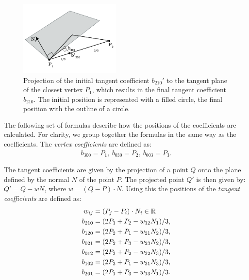 	\begin{figure}
		\centering
		\includegraphics[width=0.45\textwidth]{./content/img/method/geometry_computation.png}
		\caption{Projection of the initial tangent coefficient $b_{210}'$ to the tangent plane of the closest vertex $P_1$, which results in the final tangent coefficient $b_{210}$. The initial position is represented with a filled circle, the final position with the outline of a circle.}
		\label{fig:method:geometry_tangent_projection.png}
	\end{figure}

	The following set of formulas describe how the positions of the coefficients are calculated. For clarity, we group together the formulas in the same way as the coefficients. The \textit{vertex coefficients} are defined as:
	\begin{align}\label{eq:method:vertex_coefficients}
		b_{300} = P_1,\ b_{030} = P_2,\ b_{003} = P_3.
	\end{align}

	The tangent coefficients are given by the projection of a point $Q$ onto the plane defined by the normal $N$ of the point $P$. The projected point $Q'$ is then given by: $Q' = Q - wN$, where $w = (Q - P) \cdot N$. Using this the positions of the \textit{tangent coefficients} are defined as:
	\begin{align}\label{eq:method:tangent_coefficients}
		w_{ij} = {}& (P_j - P_i) \cdot N_i \in \mathbb{R} \nonumber\\
		b_{210} = {}& (2 P_1 + P_2 - w_{12}N_1) / 3,\nonumber\\
		b_{120} = {}& (2 P_2 + P_1 - w_{21}N_2) / 3,\nonumber\\
		b_{021} = {}& (2 P_2 + P_3 - w_{23}N_2) / 3, \\
		b_{012} = {}& (2 P_3 + P_2 - w_{32}N_3) / 3,\nonumber\\
		b_{102} = {}& (2 P_3 + P_1 - w_{31}N_3) / 3,\nonumber\\
		b_{201} = {}& (2 P_1 + P_3 - w_{13}N_1) / 3. \nonumber
	\end{align}

